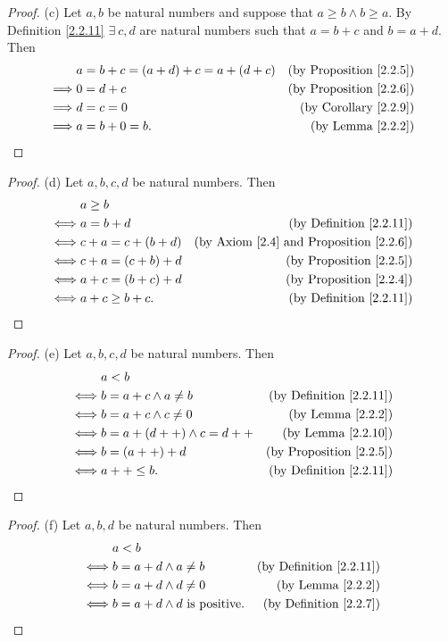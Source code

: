 \begin{proof}{(c)}
Let \(a, b\) be natural numbers and suppose that \(a \geq b \land b \geq a\).
By Definition \ref{2.2.11} \(\exists\ c, d\) are natural numbers such that \(a = b + c\) and \(b = a + d\).
Then
\begin{align*}
& a = b + c = (a + d) + c = a + (d + c) & \text{(by Proposition \ref{2.2.5})} \\
\implies & 0 = d + c & \text{(by Proposition \ref{2.2.6})} \\
\implies & d = c = 0 & \text{(by Corollary \ref{2.2.9})} \\
\implies & a = b + 0 = b. & \text{(by Lemma \ref{2.2.2})}
\end{align*}
\end{proof}

\begin{proof}{(d)}
Let \(a, b, c, d\) be natural numbers.
Then
\begin{align*}
& a \geq b \\
\iff & a = b + d & \text{(by Definition \ref{2.2.11})} \\
\iff & c + a = c + (b + d) & \text{(by Axiom \ref{2.4} and Proposition \ref{2.2.6})} \\
\iff & c + a = (c + b) + d & \text{(by Proposition \ref{2.2.5})} \\
\iff & a + c = (b + c) + d & \text{(by Proposition \ref{2.2.4})} \\
\iff & a + c \geq b + c. & \text{(by Definition \ref{2.2.11})}
\end{align*}
\end{proof}

\begin{proof}{(e)}
Let \(a, b, c, d\) be natural numbers.
Then
\begin{align*}
& a < b \\
\iff & b = a + c \land a \neq b & \text{(by Definition \ref{2.2.11})} \\
\iff & b = a + c \land c \neq 0 & \text{(by Lemma \ref{2.2.2})} \\
\iff & b = a + (d++) \land c = d++ & \text{(by Lemma \ref{2.2.10})} \\
\iff & b = (a++) + d & \text{(by Proposition \ref{2.2.5})} \\
\iff & a++ \leq b. & \text{(by Definition \ref{2.2.11})}
\end{align*}
\end{proof}

\begin{proof}{(f)}
Let \(a, b, d\) be natural numbers.
Then
\begin{align*}
& a < b \\
\iff & b = a + d \land a \neq b & \text{(by Definition \ref{2.2.11})} \\
\iff & b = a + d \land d \neq 0 & \text{(by Lemma \ref{2.2.2})} \\
\iff & b = a + d \land d \text{ is positive}. & \text{(by Definition \ref{2.2.7})}
\end{align*}
\end{proof}

